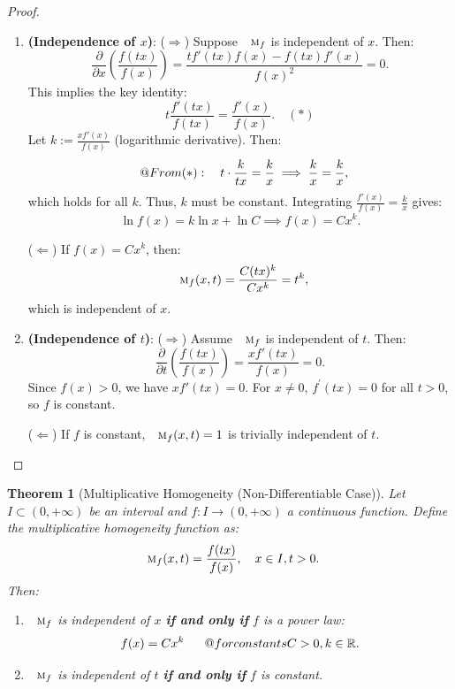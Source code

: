 \documentclass{amsart}
\makeatletter
\newtheorem{theorem}{Theorem}
\theoremstyle{plain}
\numberwithin{equation}{section}
\def\RIfM@{\relax\ifmmode}%
\def\RIfM@{\relax\protect\ifmmode}
\def\text{\RIfM@\expandafter\text@\else\expandafter\mbox\fi}
\def\text@#1{\mathchoice
   {\textdef@\displaystyle\f@size{#1}}%
   {\textdef@\textstyle\tf@size{\firstchoice@false #1}}%
   {\textdef@\textstyle\sf@size{\firstchoice@false #1}}%
   {\textdef@\textstyle \ssf@size{\firstchoice@false #1}}%
   \glb@settings}
\def\textdef@#1#2#3{\hbox{{%
                    \everymath{#1}%
                    \let\f@size#2\selectfont
                    #3}}}
\newif\iffirstchoice@
\newcommand{\mh}{\textsc{m}}
\makeatother
\begin{document}
\begin{proof}
\begin{enumerate}
    \item \textbf{(Independence of \( x \))}:
    (\(\Rightarrow\)) Suppose \( \mh_f \) is independent of \( x \). Then:
    \[
    \frac{\partial}{\partial x} \left( \frac{f(tx)}{f(x)} \right) = \frac{t f'(tx) f(x) - f(tx) f'(x)}{f(x)^2} = 0.
    \]
    This implies the key identity:
    \[
    t \frac{f'(tx)}{f(tx)} = \frac{f'(x)}{f(x)}. \quad (*)
    \]
    Let \( k := \frac{x f'(x)}{f(x)} \) (logarithmic derivative). Then:
    \[
    \text{From } (*): \quad t \cdot \frac{k}{tx} = \frac{k}{x} \implies \frac{k}{x} = \frac{k}{x},
    \]
    which holds for all \( k \). Thus, \( k \) must be constant. Integrating \( \frac{f'(x)}{f(x)} = \frac{k}{x} \) gives:
    \[
    \ln f(x) = k \ln x + \ln C \implies f(x) = Cx^k.
    \]
    
    (\(\Leftarrow\)) If \( f(x) = Cx^k \), then:
    \[
    \mh_f(x,t) = \frac{C(tx)^k}{Cx^k} = t^k,
    \]
    which is independent of \( x \).

    \item \textbf{(Independence of \( t \))}:
    (\(\Rightarrow\)) Assume \( \mh_f \) is independent of \( t \). Then:
    \[
    \frac{\partial}{\partial t} \left( \frac{f(tx)}{f(x)} \right) = \frac{x f'(tx)}{f(x)} = 0.
    \]
    Since \( f(x) > 0 \), we have \( x f'(tx) = 0 \). For \( x \neq 0 \), \( f^\prime(tx) = 0 \) for all \( t > 0 \), so \( f \) is constant.
    
    (\(\Leftarrow\)) If \( f \) is constant, \( \mh_f(x,t) = 1 \) is trivially independent of \( t \).
\end{enumerate}
\end{proof}




\begin{theorem}[Multiplicative Homogeneity (Non-Differentiable Case)]
Let \( I \subset (0, +\infty) \) be an interval and \( f:I \to (0, +\infty) \) a continuous function. 
Define the \emph{multiplicative homogeneity function} as:
\[
\mh_f(x,t) = \frac{f(tx)}{f(x)}, \quad x \in I, t > 0.
\]
Then:
\begin{enumerate}
    \item \( \mh_f \) is independent of \( x \) \textbf{if and only if} \( f \) is a power law:
    \[
    f(x) = Cx^k \quad \text{for constants } C > 0, k \in \mathbb{R}.
    \]
    \item \( \mh_f \) is independent of \( t \) \textbf{if and only if} \( f \) is constant.
\end{enumerate}
\end{theorem}
\end{document}
